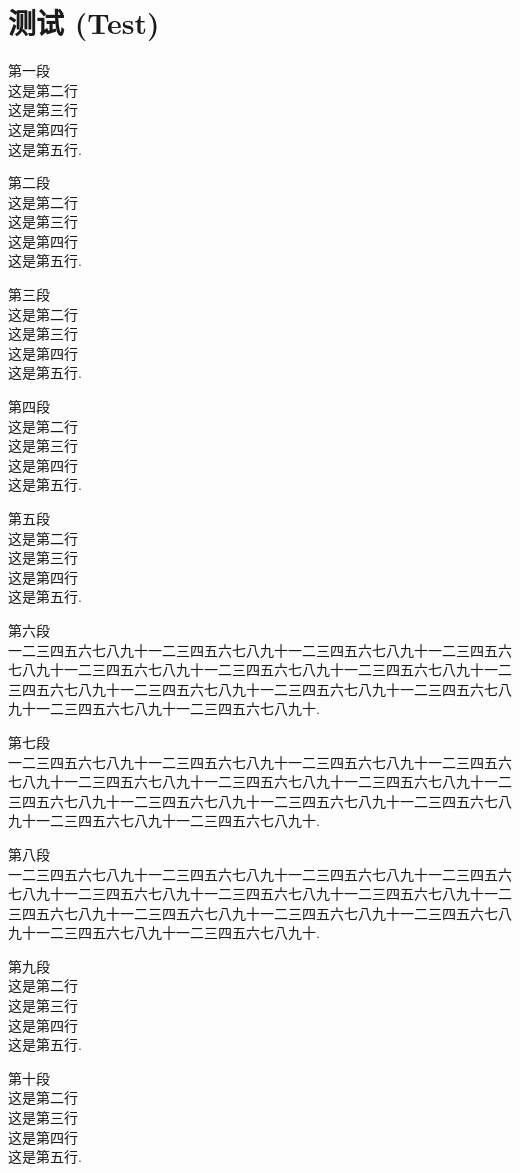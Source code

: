 \chapter{测试 (Test)}\label{chap:test}

第一段\\
这是第二行\\
这是第三行\\
这是第四行\\
这是第五行.

第二段\\
这是第二行\\
这是第三行\\
这是第四行\\
这是第五行.

第三段\\
这是第二行\\
这是第三行\\
这是第四行\\
这是第五行.

第四段\\
这是第二行\\
这是第三行\\
这是第四行\\
这是第五行.

第五段\\
这是第二行\\
这是第三行\\
这是第四行\\
这是第五行.

第六段\\
一二三四五六七八九十一二三四五六七八九十一二三四五六七八九十一二三四五六七八九十一二三四五六七八九十一二三四五六七八九十一二三四五六七八九十一二三四五六七八九十一二三四五六七八九十一二三四五六七八九十一二三四五六七八九十一二三四五六七八九十一二三四五六七八九十.

第七段\\
一二三四五六七八九十一二三四五六七八九十一二三四五六七八九十一二三四五六七八九十一二三四五六七八九十一二三四五六七八九十一二三四五六七八九十一二三四五六七八九十一二三四五六七八九十一二三四五六七八九十一二三四五六七八九十一二三四五六七八九十一二三四五六七八九十.

第八段\\
一二三四五六七八九十一二三四五六七八九十一二三四五六七八九十一二三四五六七八九十一二三四五六七八九十一二三四五六七八九十一二三四五六七八九十一二三四五六七八九十一二三四五六七八九十一二三四五六七八九十一二三四五六七八九十一二三四五六七八九十一二三四五六七八九十.

第九段\\
这是第二行\\
这是第三行\\
这是第四行\\
这是第五行.

第十段\\
这是第二行\\
这是第三行\\
这是第四行\\
这是第五行.
